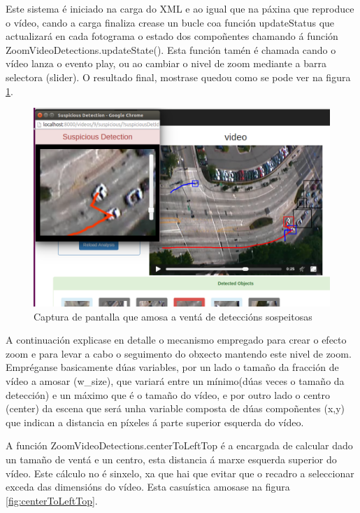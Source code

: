     Este sistema é iniciado na carga do XML e ao igual que na páxina que reproduce o vídeo, cando a 
    carga finaliza crease
    un bucle coa función updateStatus que actualizará en cada fotograma o estado dos compoñentes 
    chamando á función ZoomVideoDetections.updateState(). Esta función tamén é chamada cando o vídeo
    lanza o evento play, ou ao cambiar o nivel de zoom mediante a barra selectora (slider).
    O resultado final, mostrase quedou como se pode ver na figura \ref{fig:suspiciousPopupCapture}.

    \begin{figure}[htp]
    \begin{center}
        \includegraphics[scale=0.4]{figures/suspiciousPopupCapture.png}
        \caption{Captura de pantalla que amosa a ventá de deteccións sospeitosas}
    \label{fig:suspiciousPopupCapture}
    \end{center}
    \end{figure} 
    
    A continuación explicase en detalle o mecanismo empregado para crear o efecto zoom e para 
    levar a cabo o seguimento do obxecto mantendo este nivel de zoom. Empréganse 
    basicamente dúas variables, por un lado o tamaño da fracción de vídeo a amosar (w\_size), que
    variará entre un mínimo(dúas veces o tamaño da detección) e un máximo que é o tamaño do vídeo, 
    e por outro lado o centro (center) da escena que será unha variable composta de dúas 
    compoñentes (x,y) que indican a distancia en píxeles á parte superior esquerda do vídeo.
    
    A función ZoomVideoDetections.centerToLeftTop é a encargada de calcular dado un tamaño de ventá 
    e un centro, esta distancia á marxe esquerda superior do vídeo. Este cálculo no é sinxelo, xa que 
    hai que evitar que o recadro a seleccionar exceda das dimensións do vídeo. Esta casuística 
    amosase na figura \ref{fig:centerToLeftTop}.
    

